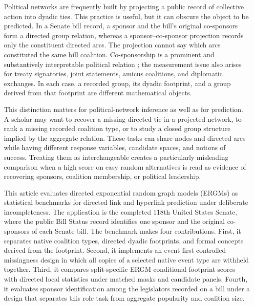 \documentclass{nws}
\begin{document}
Political networks are frequently built by projecting a public record of collective action into dyadic ties. This practice is useful, but it can obscure the object to be predicted. In a Senate bill record, a sponsor and the bill's original co-sponsors form a directed group relation, whereas a sponsor--co-sponsor projection records only the constituent directed arcs. The projection cannot say which arcs constituted the same bill coalition. Co-sponsorship is a prominent and substantively interpretable political relation \citep{fowler2006,talbertPotoski2002,zhangEtAl2008}; the measurement issue also arises for treaty signatories, joint statements, amicus coalitions, and diplomatic exchanges. In each case, a recorded group, its dyadic footprint, and a group derived from that footprint are different mathematical objects.

This distinction matters for political-network inference as well as for prediction. A scholar may want to recover a missing directed tie in a projected network, to rank a missing recorded coalition type, or to study a closed group structure implied by the aggregate relation. These tasks can share nodes and directed arcs while having different response variables, candidate spaces, and notions of success. Treating them as interchangeable creates a particularly misleading comparison when a high score on easy random alternatives is read as evidence of recovering sponsors, coalition membership, or political leadership.

This article evaluates directed exponential random graph models (ERGMs) as statistical benchmarks for directed link and hyperlink prediction under deliberate incompleteness. The application is the completed 118th United States Senate, where the public Bill Status record identifies one sponsor and the original co-sponsors of each Senate bill. The benchmark makes four contributions. First, it separates native coalition types, directed dyadic footprints, and formal concepts derived from the footprint. Second, it implements an event-first controlled-missingness design in which all copies of a selected native event type are withheld together. Third, it compares split-specific ERGM conditional footprint scores with directed local statistics under matched masks and candidate panels. Fourth, it evaluates sponsor identification among the legislators recorded on a bill under a design that separates this role task from aggregate popularity and coalition size.
\end{document}
